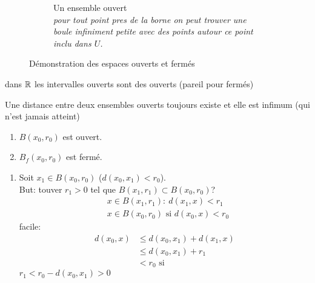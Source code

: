 \begin{figure}[H]
\begin{subfigure}{0.45\textwidth}
        \caption{Un ensemble ouvert\\
            \textit{
                pour tout point pres de la borne
                on peut trouver une boule
                infiniment petite avec des
                points autour ce point inclu dans $U$.
            }
        }

    \end{subfigure}
    \caption{Démonstration des espaces ouverts et fermés}
\end{figure}
\begin{remark}
   dans $\mathbb{R}$ les intervalles ouverts sont des ouverts (pareil pour fermés) 
\end{remark}
\begin{remark}
   Une distance entre deux ensembles ouverts toujours existe et elle est infimum (qui n'est jamais atteint) 
\end{remark}
\begin{lemma}
   \begin{enumerate}
       \item $B(x_0, r_0)$ est ouvert.
       \item $B_f(x_0, r_0)$ est fermé.
   \end{enumerate} 
\end{lemma}
\begin{preuve}
   \begin{enumerate}
       \item Soit $x_1 \in B(x_0, r_0)$ ($d(x_0, x_1) < r_0$).\\
           But: touver $r_1 > 0$ tel que $B(x_1, r_1) \subset B(x_0, r_0)$?\\
           \begin{align*}
               &x \in B(x_1, r_1): \: d(x_1, x) < r_1\\
               &x \in B(x_0, r_0) \text{ si } d(x_0, x) < r_0
           \end{align*}
           facile:
           \begin{align*}
               d(x_0, x) &\le d(x_0, x_1) + d(x_1, x)\\
                         &\le d(x_0, x_1) + r_1\\
                         &< r_0 \text{ si}
           \end{align*}
           $r_1 < r_0 - d(x_0, x_1) > 0$
   \end{enumerate} 
\end{preuve}
